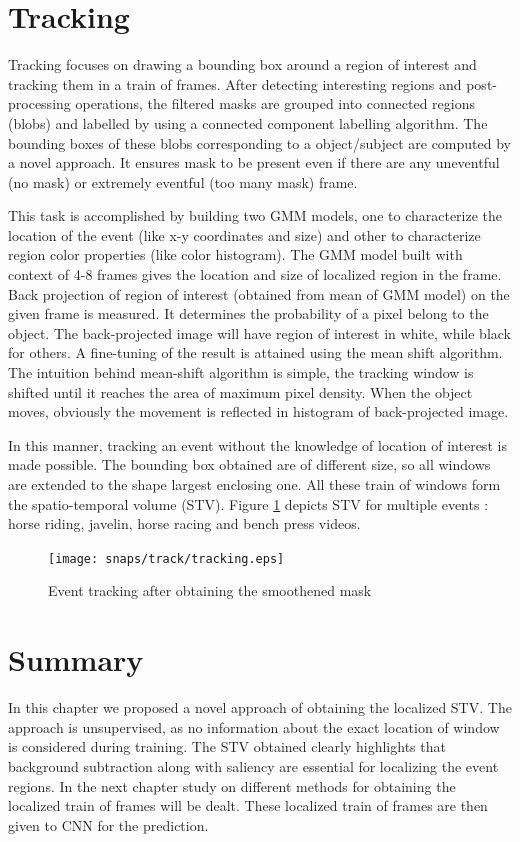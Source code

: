 \section{Tracking}
 \label{sec:trac}
Tracking focuses on drawing a bounding box around a region of interest and tracking them in a train of frames.  After detecting interesting regions and post-processing operations, the filtered masks are grouped into connected regions (blobs) and labelled by using a connected component labelling algorithm.  The bounding boxes of these blobs corresponding to a object/subject are computed by a novel approach.  It ensures mask to be present even if there are any uneventful (no mask) or extremely eventful (too many mask) frame.
\par This task is accomplished by building two GMM models, one to characterize the location of the event (like x-y coordinates and size) and other to characterize region color properties (like color histogram).  The GMM model built with context of 4-8 frames gives the location and size of localized region in the frame.  Back projection \citep{backProj} of region of interest (obtained from mean of GMM model) on the given frame is measured. It determines the probability of a pixel belong to the object.  The back-projected image  will have region of interest in white, while black for others.  A fine-tuning of the result is attained using the mean shift algorithm.  The intuition behind mean-shift algorithm is simple, the tracking window is shifted until it reaches the area of maximum pixel density.  When the object moves, obviously the movement is reflected in histogram of back-projected image. 
\par In this manner, tracking an event without the knowledge of location of interest is made possible.  The bounding box obtained are of different size, so all windows are extended to the shape largest enclosing one.  All these train of  windows form the spatio-temporal volume (STV). Figure \ref{fig:tracking} depicts STV for multiple events : horse riding, javelin, horse racing and bench press videos.
\begin{figure}[htpb]
   \begin{center}
	    \texttt{[image: snaps/track/tracking.eps]}     
     \caption {Event tracking after obtaining the smoothened mask}
   \label{fig:tracking}
   \end{center}
 \end{figure}
\section{Summary}
In this chapter we proposed a novel approach of obtaining the localized STV.  The approach is unsupervised, as no information about the exact location of window is considered during training.  The STV obtained clearly highlights that background subtraction along with saliency are essential for localizing the event regions. In the next chapter study on different methods for obtaining the localized train of frames will be dealt.  These localized train of frames are then given to CNN for the prediction.